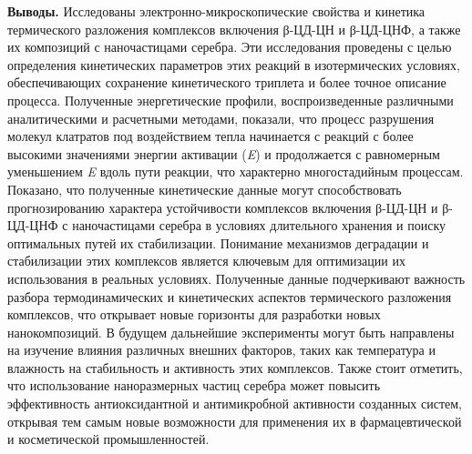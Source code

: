 
{\bfseries Выводы.} Исследованы электронно-микроскопические свойства и
кинетика термического разложения комплексов включения β-ЦД-ЦН и
β-ЦД-ЦНФ, а также их композиций с наночастицами серебра. Эти
исследования проведены с целью определения кинетических параметров этих
реакций в изотермических условиях, обеспечивающих сохранение
кинетического триплета и более точное описание процесса. Полученные
энергетические профили, воспроизведенные различными аналитическими и
расчетными методами, показали, что процесс разрушения молекул клатратов
под воздействием тепла начинается с реакций с более высокими значениями
энергии активации (\emph{E}) и продолжается с
равномерным уменьшением \emph{E} вдоль пути реакции,
что характерно многостадийным процессам. Показано, что полученные
кинетические данные могут способствовать прогнозированию характера
устойчивости комплексов включения β-ЦД-ЦН и β-ЦД-ЦНФ с наночастицами
серебра в условиях длительного хранения и поиску оптимальных путей их
стабилизации. Понимание механизмов деградации и стабилизации этих
комплексов является ключевым для оптимизации их использования в реальных
условиях. Полученные данные подчеркивают важность разбора
термодинамических и кинетических аспектов термического разложения
комплексов, что открывает новые горизонты для разработки новых
нанокомпозиций. В будущем дальнейшие эксперименты могут быть направлены
на изучение влияния различных внешних факторов, таких как температура и
влажность на стабильность и активность этих комплексов. Также стоит
отметить, что использование наноразмерных частиц серебра может повысить
эффективность антиоксидантной и антимикробной активности созданных
систем, открывая тем самым новые возможности для применения их в
фармацевтической и косметической промышленностей.

